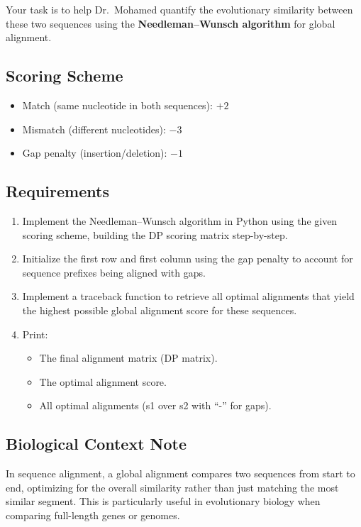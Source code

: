 \documentclass[12pt]{article}
\begin{document}
Your task is to help Dr.~Mohamed quantify the evolutionary similarity between these two sequences using the \textbf{Needleman--Wunsch algorithm} for global alignment.

\subsection*{Scoring Scheme}
\begin{itemize}[leftmargin=2cm]
    \item Match (same nucleotide in both sequences): $+2$
    \item Mismatch (different nucleotides): $-3$
    \item Gap penalty (insertion/deletion): $-1$
\end{itemize}

\subsection*{Requirements}
\begin{enumerate}[leftmargin=1.2cm]
    \item Implement the Needleman--Wunsch algorithm in Python using the given scoring scheme, building the DP scoring matrix step-by-step.
    \item Initialize the first row and first column using the gap penalty to account for sequence prefixes being aligned with gaps.
    \item Implement a traceback function to retrieve all optimal alignments that yield the highest possible global alignment score for these sequences.
    \item Print:
    \begin{itemize}
        \item The final alignment matrix (DP matrix).
        \item The optimal alignment score.
        \item All optimal alignments (s1 over s2 with ``-'' for gaps).
    \end{itemize}
\end{enumerate}

\subsection*{Biological Context Note}
In sequence alignment, a global alignment compares two sequences from start to end, optimizing for the overall similarity rather than just matching the most similar segment. This is particularly useful in evolutionary biology when comparing full-length genes or genomes.
\end{document}
